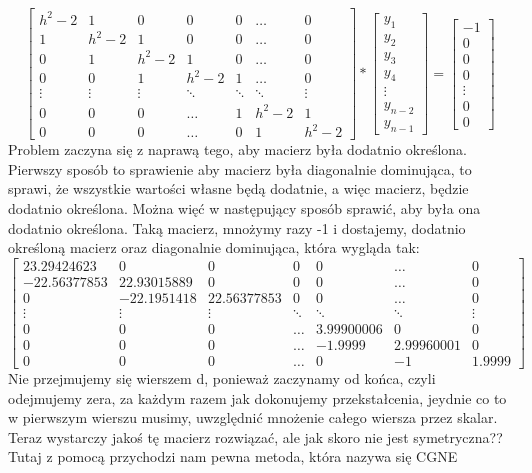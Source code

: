 \documentclass[12pt]{article}
\begin{document}
\[
\begin{bmatrix}
    h^{2}-2 & 1 & 0 & 0 & 0 & \dots & 0\\
    1 & h^{2}-2 & 1 & 0 & 0 & \dots & 0\\ 
    0 & 1 & h^{2}-2 & 1 & 0 & \dots & 0\\
    0 & 0 & 1 & h^{2}-2 & 1 &\dots & 0\\
    \vdots & \vdots & \vdots & \ddots & \ddots & \ddots & \vdots\\
    0 & 0 & 0 & \hdots & 1 & h^{2}-2 & 1\\
    0 & 0 & 0 & \hdots & 0 & 1 & h^{2}-2
\end{bmatrix}
*
\begin{bmatrix}
    y_{1}\\
    y_{2}\\
    y_{3}\\
    y_{4}\\
    \vdots\\
    y_{n-2}\\
    y_{n-1}
\end{bmatrix}
=
\begin{bmatrix}
    -1\\
    0\\
    0\\
    0\\
    \vdots\\
    0\\
    0
\end{bmatrix}
\]
Problem zaczyna się z naprawą tego, aby macierz była dodatnio określona. Pierwszy sposób to sprawienie aby macierz była diagonalnie dominująca, to sprawi, że wszystkie wartości własne będą dodatnie, a więc macierz, będzie dodatnio określona. Można więć w następujący sposób sprawić, aby była ona dodatnio określona. Taką macierz, mnożymy razy -1 i dostajemy, dodatnio określoną macierz oraz diagonalnie dominująca, która wygląda tak: 
\[
\begin{bmatrix}
    23.29424623 & 0 & 0 & 0 & 0 & \dots & 0\\
    -22.56377853 & 22.93015889 & 0 & 0 & 0 & \dots & 0\\ 
    0 & -22.1951418 & 22.56377853 & 0 & 0 & \dots & 0\\
    \vdots & \vdots & \vdots & \ddots & \ddots & \ddots & \vdots\\
    0 & 0 & 0 & \hdots & 3.99900006 & 0 & 0\\
    0 & 0 & 0 & \hdots & -1.9999 & 2.99960001 & 0\\
    0 & 0 & 0 & \hdots & 0 & -1 & 1.9999
\end{bmatrix}
\]
Nie przejmujemy się wierszem d, ponieważ zaczynamy od końca, czyli odejmujemy zera, za każdym razem jak dokonujemy przekstałcenia, jeydnie co to w pierwszym wierszu musimy, uwzględnić mnożenie całego wiersza przez skalar. Teraz wystarczy jakoś tę macierz rozwiązać, ale jak skoro nie jest symetryczna?? Tutaj z pomocą przychodzi nam pewna metoda, która nazywa się CGNE
\end{document}

